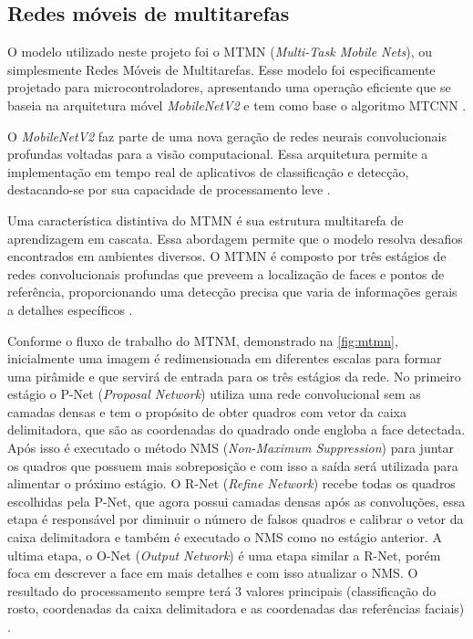 \subsection{Redes móveis de multitarefas}\label{subsec:multmobile}

O modelo utilizado neste projeto foi o MTMN (\textit{Multi-Task Mobile Nets}), ou 
simplesmente Redes Móveis de Multitarefas. Esse modelo foi especificamente 
projetado para microcontroladores, apresentando uma operação 
eficiente que se baseia na arquitetura móvel \textit{MobileNetV2} e tem 
como base o algoritmo MTCNN \cite{mtmnimg}.

O \textit{MobileNetV2} faz parte de uma nova geração de redes 
neurais convolucionais profundas voltadas para a 
visão computacional. Essa arquitetura permite a 
implementação em tempo real de aplicativos de 
classificação e detecção, destacando-se por 
sua capacidade de processamento leve \cite[p. 4]{luna2022}.

Uma característica distintiva do MTMN é sua estrutura 
multitarefa de aprendizagem em cascata. Essa abordagem 
permite que o modelo resolva desafios encontrados em 
ambientes diversos. O MTMN é composto por três 
estágios de redes convolucionais profundas que preveem a 
localização de faces e pontos de referência, proporcionando 
uma detecção precisa que varia de informações gerais a 
detalhes específicos \cite[p. 4]{luna2022}.

Conforme o fluxo de trabalho do MTNM, demonstrado na \autoref{fig:mtmn}, 
inicialmente uma imagem é redimensionada em diferentes escalas para formar uma pirâmide e que 
servirá de entrada para os três estágios da rede. No primeiro estágio o P-Net (\textit{Proposal Network}) 
utiliza uma rede convolucional sem as camadas densas e tem o propósito de obter quadros com 
vetor da caixa delimitadora, que são as coordenadas do quadrado onde engloba a face detectada. 
Após isso é executado o método NMS (\textit{Non-Maximum Suppression}) para juntar os quadros que 
possuem mais sobreposição e com isso a saída será utilizada para alimentar o próximo estágio. O R-Net 
(\textit{Refine Network}) recebe todas os quadros escolhidas pela P-Net, que agora possui camadas 
densas após as convoluções, essa etapa é responsável por diminuir o número de falsos quadros 
e calibrar o vetor da caixa delimitadora e também é executado o NMS como no estágio anterior. A ultima etapa, 
o O-Net (\textit{Output Network}) é uma etapa similar a R-Net, porém foca em descrever a face em 
mais detalhes e com isso atualizar o NMS. O resultado do processamento sempre terá 3 valores 
principais (classificação do rosto, coordenadas da caixa delimitadora e as 
coordenadas das referências faciais) \cite[p. 2-3]{zhang2016}.

